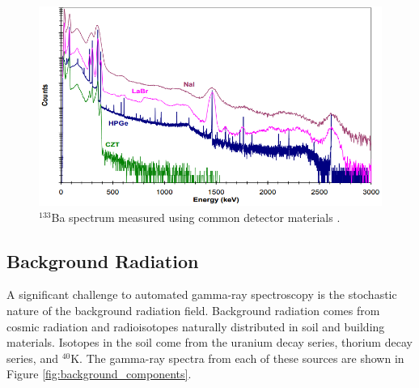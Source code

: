 \begin{figure}[H]
\centering
\includegraphics[width=0.8\linewidth]{images/Ba133_spectrum_different_detector_materials_Market_Survey_Report}
\caption{$^{133}$Ba spectrum measured using common detector materials \cite{RIIDMarketSurveyReport}.}
\label{fig:Ba133_spectrum_different_detector_materials_Market_Survey_Report}
\end{figure}


\subsection{Background Radiation}



A significant challenge to automated gamma-ray spectroscopy is the stochastic nature of the background radiation field. Background radiation comes from cosmic radiation and radioisotopes naturally distributed in soil and building materials. Isotopes in the soil come from the uranium decay series, thorium  decay series, and $^{40}$K. The gamma-ray spectra from each of these sources are shown in Figure \ref{fig:background_components}. 

